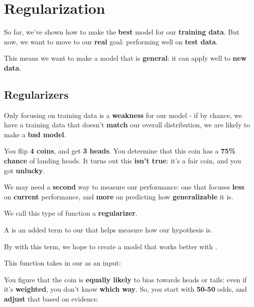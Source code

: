 
\section*{Regularization}
    
    So far, we've shown how to make the \textbf{best} model for our \textbf{training data}. But now, we want to move to our \textbf{real} goal: performing well on \textbf{test data}.
    
    This means we want to make a model that is \textbf{general}: it can apply well to \textbf{new data}.
    
    \subsection*{Regularizers}
        
        Only focusing on training data is a \textbf{weakness} for our model - if by chance, we have a training data that doesn't \textbf{match} our overall distribution, we are likely to make a \textbf{bad model}.
        
        \miniex You flip \textbf{4 coins}, and get \textbf{3 heads}. You determine that this coin has a \textbf{75\% chance} of landing heads. It turns out this \textbf{isn't true}: it's a fair coin, and you got \textbf{unlucky}.
        
         We may need a \textbf{second} way to measure our performance: one that focuses \textbf{less} on \textbf{current} performance, and \textbf{more} on predicting how \textbf{generalizable} it is.
        
        We call this type of function a \textbf{regularizer}.\\
        
        \begin{definition}
            A  is an added term to our  that helps measure how  our hypothesis is.
            
            By  with this term, we hope to create a model that works better with .
            
            This function takes in our  \gren{$\Theta$} as an input: 
        \end{definition}
        
        \miniex You figure that the coin is \textbf{equally likely} to bias towards heads or tails: even if it's \textbf{weighted}, you don't know \textbf{which way}. So, you start with \textbf{50-50} odds, and \textbf{adjust} that based on evidence.
        
